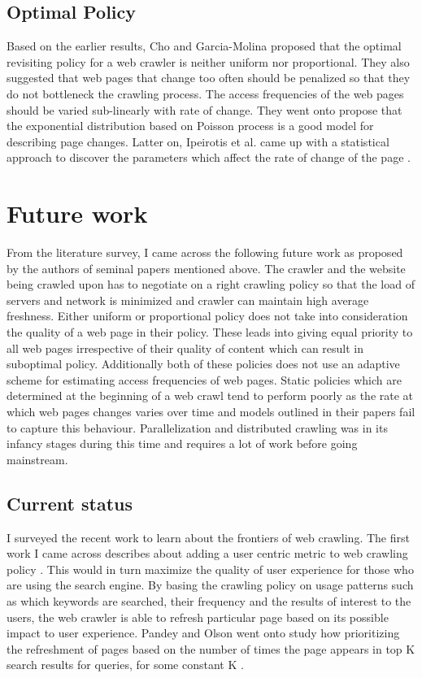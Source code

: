 \documentclass[a4paper, 11pt]{article} %
\begin{document}
\subsection{Optimal Policy}

Based on the earlier results, Cho and Garcia-Molina proposed that the optimal revisiting policy for a web crawler is neither uniform nor proportional. \cite{cho2003estimating} They also suggested that web pages that change too often should be penalized so that they do not bottleneck the crawling process. The access frequencies of the web pages should be varied sub-linearly with rate of change. They went onto propose that the exponential distribution based on Poisson process is a good model for describing page changes. Latter on, Ipeirotis et al. came up with a statistical approach to discover the parameters which affect the rate of change of the page \cite{ipeirotis2005modeling}.

\section{Future work}

From the literature survey, I came across the following future work as proposed by the authors of seminal papers mentioned above. The crawler and the website being crawled upon has to negotiate on a right crawling policy so that the load of servers and network is minimized and crawler can maintain high average freshness. Either uniform or proportional policy does not take into consideration the quality of a web page in their policy. These leads into giving equal priority to all web pages irrespective of their quality of content which can result in suboptimal policy. Additionally both of these policies does not use an adaptive scheme for estimating access frequencies of web pages. Static policies which are determined at the beginning of a web crawl tend to perform poorly as the rate at which web pages changes varies over time and models outlined in their papers fail to capture this behaviour. Parallelization and distributed crawling  was in its infancy stages during this time and requires a lot of work before going mainstream.

\subsection{Current status}

I surveyed the recent work to learn about the frontiers of web crawling. The first work I came across describes about adding a user centric metric to web crawling policy \cite{pandey2005user}. This would in turn maximize the quality of user experience for those who are using the search engine. By basing the crawling policy on usage patterns such as which keywords are searched, their frequency and the results of interest to the users, the web crawler is able to refresh particular page based on its possible impact to user experience. Pandey and Olson went onto study how prioritizing the refreshment of pages based on the number of times the page appears in top K search results for queries, for some constant K \cite{pandey2008crawl}. \\
\end{document}
